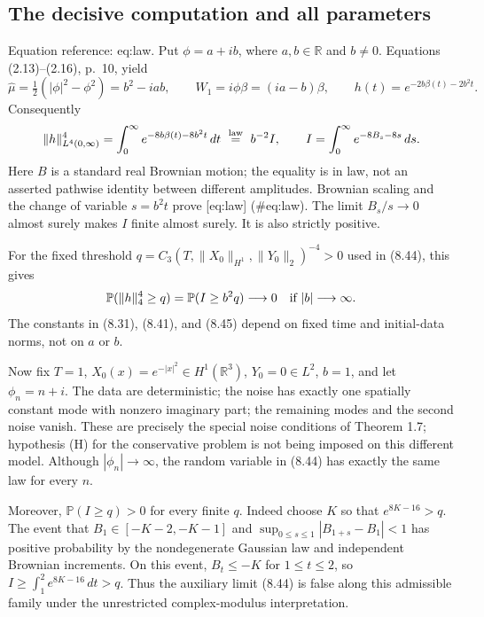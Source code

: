 \documentclass[10pt]{article}
\begin{document}
\subsection*{The decisive computation and all parameters}
Equation reference: eq:law. Put \(\phi=a+ib\), where \(a,b\in\mathbb R\) and \(b\ne0\). Equations (2.13)–(2.16), p. 10, yield \[\widehat\mu=\tfrac12(|\phi|^2-\phi^2)=b^2-iab,\qquad
 W_1=i\phi\beta=(ia-b)\beta,\qquad
 h(t)=e^{-2b\beta(t)-2b^2t}.\] Consequently \[
 \|h\|_{L^4(0,\infty)}^4
 =\int_0^\infty e^{-8b\beta(t)-8b^2t}\,dt
 \ \stackrel{\rm law}{=}\
 b^{-2}I,\qquad I=\int_0^\infty e^{-8B_s-8s}\,ds .\] Here \(B\) is a standard real Brownian motion; the equality is in law, not an asserted pathwise identity between different amplitudes. Brownian scaling and the change of variable \(s=b^2t\) prove [eq:law] (\#eq:law). The limit \(B_s/s\to0\) almost surely makes \(I\) finite almost surely. It is also strictly positive.\par
For the fixed threshold \(q=C_3(T,\|X_0\|_{H^1},\|Y_0\|_2)^{-4}>0\) used in (8.44), this gives \[\mathbb P(\|h\|_4^4\ge q)=\mathbb P(I\ge b^2q)\longrightarrow0
 \quad\hbox{if } |b|\longrightarrow\infty .\] The constants in (8.31), (8.41), and (8.45) depend on fixed time and initial-data norms, not on \(a\) or \(b\).\par
Now fix \(T=1\), \(X_0(x)=e^{-|x|^2}\in H^1(\mathbb R^3)\), \(Y_0=0\in L^2\), \(b=1\), and let \(\phi_n=n+i\). The data are deterministic; the noise has exactly one spatially constant mode with nonzero imaginary part; the remaining modes and the second noise vanish. These are precisely the special noise conditions of Theorem 1.7; hypothesis (H) for the conservative problem is not being imposed on this different model. Although \(|\phi_n|\to\infty\), the random variable in (8.44) has exactly the same law for every \(n\).\par
Moreover, \(\mathbb P(I\ge q)>0\) for every finite \(q\). Indeed choose \(K\) so that \(e^{8K-16}>q\). The event that \(B_1\in[-K-2,-K-1]\) and \(\sup_{0\le s\le1}|B_{1+s}-B_1|<1\) has positive probability by the nondegenerate Gaussian law and independent Brownian increments. On this event, \(B_t\le-K\) for \(1\le t\le2\), so \(I\ge\int_1^2e^{8K-16}\,dt>q\). Thus the auxiliary limit (8.44) is false along this admissible family under the unrestricted complex-modulus interpretation.\par
\end{document}
